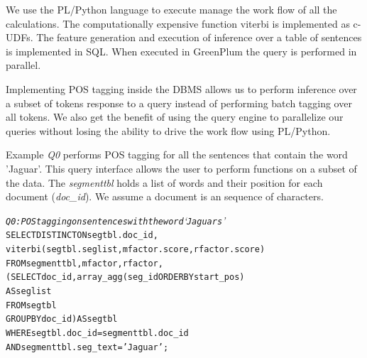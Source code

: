 We use the PL/Python language to execute manage the work flow of all the 
calculations.
The computationally expensive function viterbi is implemented as c-UDFs.
The feature generation and execution of inference 
over a table of sentences is implemented in SQL. When executed in GreenPlum 
the query is performed in parallel.


Implementing POS tagging inside the DBMS allows us to perform inference over a 
subset of tokens response to a query instead of performing batch tagging over 
all tokens.
We also get the benefit of using the query engine to parallelize our queries
without losing the ability to drive the work flow using PL/Python.


Example \textit{Q0} performs POS tagging for  all the sentences that contain
the word 'Jaguar'. This query interface allows the user to perform
functions on a subset of the data.
The \textit{segmenttbl} holds a list of words and their position for each
document (\textit{doc\_id}). We assume a document is an sequence of characters.



\begin{small}
\begin{alltt}
\textit{Q0: POS tagging on sentences with the word `Jaguars'}
SELECT DISTINCT ON segtbl.doc_id,
    viterbi(segtbl.seglist,mfactor.score,rfactor.score)
FROM segmenttbl, mfactor, rfactor, 
    (SELECT doc_id, array_agg(seg_id ORDER BY start_pos)
			AS seglist
     FROM segtbl 
     GROUP BY doc_id) AS segtbl
WHERE segtbl.doc_id = segmenttbl.doc_id 
    AND segmenttbl.seg_text='Jaguar';
\end{alltt}
\end{small}












